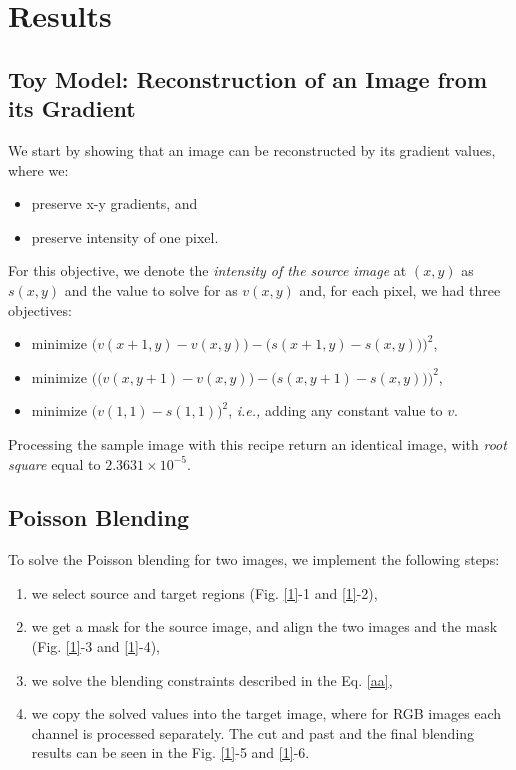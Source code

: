 \documentclass[11pt]{article}
\newcommand{\ie}{{\it i.e., }}
\begin{document}
\quad

\section{Results}

\quad

\subsection*{Toy Model: Reconstruction of an Image from its Gradient}

We start by showing that an image can be reconstructed by its gradient values, where we:
\begin{itemize}
\item preserve x-y gradients, and
\item preserve intensity of one pixel.
\end{itemize}

\quad

For this objective, we denote the {\it intensity of the source image} at $(x, y)$ as $s(x,y)$ and the value to solve for as $v(x,y)$ and, for each pixel, we had three objectives: 
\begin{itemize}
\item minimize $\Bigg (v(x+1,y)-v(x,y)\Big) - \Big(s(x+1,y)-s(x,y)\Big) \Bigg)^2 $,
\item minimize $\Bigg( \Big(v(x,y+1)-v(x,y)\Big) - \Big(s(x,y+1)-s(x,y)\Big) \Bigg)^2 $, 
\item minimize $\Big(v(1,1)-s(1,1)\Big)^2 $, \ie adding any constant value to $v$.
\end{itemize}

\quad

Processing the sample image with this recipe return an identical image, with  {\it root square} equal to $2.3631\times 10^{-5}$.





\quad

\subsection*{Poisson Blending}

To solve the Poisson blending for two images, we implement the following steps:
\begin{enumerate}
\item we select source and target regions (Fig. \ref{1}-1 and  \ref{1}-2),
\item we get a mask for the source image, and align the two images and the mask (Fig. \ref{1}-3 and \ref{1}-4),
\item we solve the blending constraints described in the Eq. \ref{aa},
\item we copy the solved values into the target image, where for RGB images each channel is processed separately. The cut and past and the final blending results can be seen in the Fig. \ref{1}-5 and  \ref{1}-6.
\end{enumerate}
\end{document}
